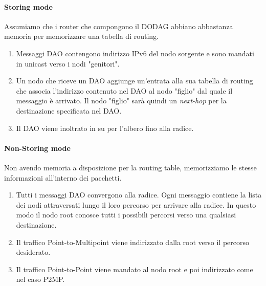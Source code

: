 \documentclass{article}
\begin{document}
\paragraph{Storing mode} Assumiamo che i router che compongono il DODAG abbiano abbastanza memoria per memorizzare una tabella di routing.
\begin{enumerate}
    \item Messaggi DAO contengono indirizzo IPv6 del nodo sorgente e sono mandati in unicast verso i nodi "genitori".
    \item Un nodo che riceve un DAO aggiunge un'entrata alla sua tabella di routing che associa l'indirizzo contenuto nel DAO al nodo "figlio" dal quale il messaggio è arrivato. Il nodo "figlio" sarà quindi un \textit{next-hop} per la destinazione specificata nel DAO.
    \item Il DAO viene inoltrato in su per l'albero fino alla radice.
\end{enumerate}
\paragraph{Non-Storing mode} Non avendo memoria a disposizione per la routing table, memorizziamo le stesse informazioni all'interno dei pacchetti.
\begin{enumerate}
    \item Tutti i messaggi DAO convergono alla radice. Ogni messaggio contiene la lista dei nodi attraversati lungo il loro percorso per arrivare alla radice. In questo modo il nodo root conosce tutti i possibili percorsi verso una qualsiasi destinazione.
    \item Il traffico Point-to-Multipoint viene indirizzato dalla root verso il percorso desiderato.
    \item Il traffico Point-to-Point viene mandato al nodo root e poi indirizzato come nel caso P2MP.
\end{enumerate}

\newpage
\end{document}
